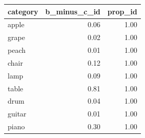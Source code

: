 \begin{table}[ht]
\centering
\begin{tabular}{lrr}
  \hline
category & b\_minus\_c\_id & prop\_id \\ 
  \hline
apple & 0.06 & 1.00 \\ 
  grape & 0.02 & 1.00 \\ 
  peach & 0.01 & 1.00 \\ 
  chair & 0.12 & 1.00 \\ 
  lamp & 0.09 & 1.00 \\ 
  table & 0.81 & 1.00 \\ 
  drum & 0.04 & 1.00 \\ 
  guitar & 0.01 & 1.00 \\ 
  piano & 0.30 & 1.00 \\ 
   \hline
\end{tabular}
\end{table}
